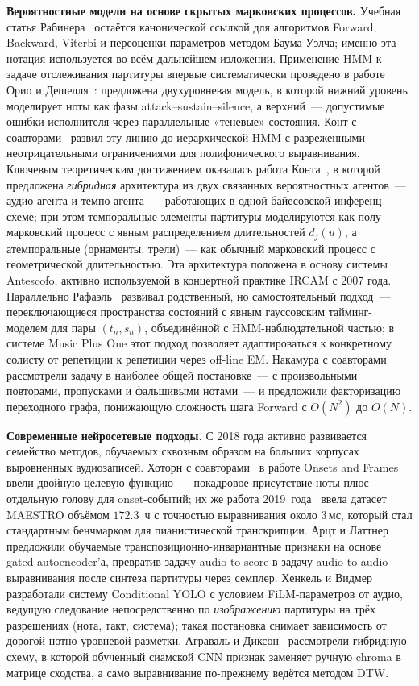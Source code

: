 \textbf{Вероятностные модели на основе скрытых марковских
процессов.} Учебная статья Рабинера~\cite{Rabiner1989} остаётся
канонической ссылкой для алгоритмов Forward, Backward, Viterbi
и переоценки параметров методом Баума-Уэлча; именно эта нотация
используется во всём дальнейшем изложении. Применение HMM к
задаче отслеживания партитуры впервые систематически проведено
в работе Орио и Дешелля~\cite{OrioDechelle2001}: предложена
двухуровневая модель, в которой нижний уровень моделирует
ноты как фазы attack--sustain--silence, а верхний~--- допустимые
ошибки исполнителя через параллельные «теневые» состояния. Конт
с соавторами~\cite{Cont2006} развил эту линию до иерархической
HMM с разреженными неотрицательными ограничениями для
полифонического выравнивания. Ключевым теоретическим достижением
оказалась работа Конта~\cite{Cont2010}, в которой предложена
\textit{гибридная} архитектура из двух связанных вероятностных
агентов~--- аудио-агента и темпо-агента~--- работающих в одной
байесовской инференц-схеме; при этом темпоральные элементы
партитуры моделируются как полу-марковский процесс с явным
распределением длительностей $d_j(u)$, а атемпоральные
(орнаменты, трели)~--- как обычный марковский процесс с
геометрической длительностью. Эта архитектура положена в основу
системы Antescofo, активно используемой в концертной практике
IRCAM с 2007 года. Параллельно Рафаэль~\cite{Raphael2010}
развивал родственный, но самостоятельный подход~---
переключающиеся пространства состояний с явным гауссовским
тайминг-моделем для пары $(t_n,s_n)$, объединённой с
HMM-наблюдательной частью; в системе Music Plus One этот подход
позволяет адаптироваться к конкретному солисту от репетиции к
репетиции через off-line EM. Накамура с соавторами~\cite{Nakamura2015}
рассмотрели задачу в наиболее общей постановке~--- с
произвольными повторами, пропусками и фальшивыми нотами~--- и
предложили факторизацию переходного графа, понижающую сложность
шага Forward с $O(N^2)$ до $O(N)$.

\textbf{Современные нейросетевые подходы.} С 2018 года активно
развивается семейство методов, обучаемых сквозным образом на
больших корпусах выровненных аудиозаписей. Хоторн с
соавторами~\cite{Hawthorne2018} в работе Onsets and Frames
ввели двойную целевую функцию~--- покадровое присутствие ноты
плюс отдельную голову для onset-событий; их же работа
2019~года~\cite{Hawthorne2019Maestro} ввела датасет MAESTRO
объёмом $172.3$~ч с точностью выравнивания около $3$\,мс,
который стал стандартным бенчмарком для пианистической
транскрипции. Арцт и Латтнер~\cite{ArztLattner2018} предложили
обучаемые транспозиционно-инвариантные признаки на основе
gated-autoencoder’а, превратив задачу audio-to-score в задачу
audio-to-audio выравнивания после синтеза партитуры через
семплер. Хенкель и Видмер~\cite{Henkel2021} разработали
систему Conditional YOLO с условием FiLM-параметров от аудио,
ведущую следование непосредственно по \textit{изображению}
партитуры на трёх разрешениях (нота, такт, система); такая
постановка снимает зависимость от дорогой нотно-уровневой
разметки. Аграваль и Диксон~\cite{AgrawalDixon2019} рассмотрели
гибридную схему, в которой обученный сиамской CNN признак
заменяет ручную chroma в матрице сходства, а само выравнивание
по-прежнему ведётся методом DTW.

